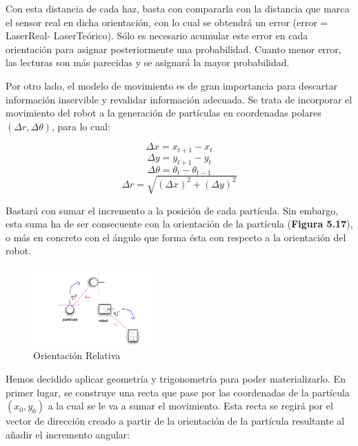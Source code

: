 Con esta distancia de cada haz, basta con compararla con la distancia que marca el sensor real en dicha orientación, con lo cual se obtendrá un error (error = LaserReal- LaserTeórico). Sólo es necesario acumular este error en cada orientación para asignar posteriormente una probabilidad. Cuanto menor error, las lecturas son más parecidas y se asignará la mayor probabilidad.

Por otro lado, el modelo de movimiento es de gran importancia para descartar información inservible y revalidar información adecuada. Se trata de incorporar el movimiento del robot a la generación de partículas en coordenadas polares $(\Delta r, \Delta\theta)$, para lo cual: 

\begin{equation}
\Delta x = x_{t+1} - x_{t}
\end{equation}
\begin{equation}
\Delta y = y_{t+1} - y_{t}
\end{equation}
\begin{equation}
\Delta\theta = \theta_{t} - \theta_{t-1}
\end{equation}
\begin{equation}
\Delta r = \sqrt{(\Delta x)^2+(\Delta y)^2}
\end{equation}

Bastará con sumar el incremento a la posición de cada partícula. Sin embargo, esta suma ha de ser consecuente con la orientación de la partícula (\textbf{Figura 5.17}), o más en concreto con el ángulo que forma ésta con respecto a la orientación del robot.

\begin{figure}[H]
\begin{center}
	\includegraphics[width=0.4\textwidth]{figures/orientacionrelativa.png}
	\caption{Orientación Relativa}
	\label{fig.orientacionrelativa}
	\end{center}
\end{figure}

Hemos decidido aplicar geometría y trigonometría para poder materializarlo. En primer lugar, se construye una recta que pase por las coordenadas de la partícula $(x_{0},y_{0})$ a la cual se le va a sumar el movimiento. Esta recta se regirá por el vector de dirección creado a partir de la orientación de la partícula resultante al añadir el incremento angular:

